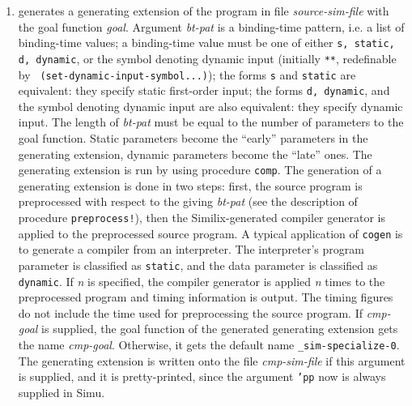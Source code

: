 \begin{sloppypar}
\begin{enumerate}
\item generates a generating extension of the program in file
   {\it source-sim-file} with the goal function {\it goal}.  Argument
   {\it bt-pat} is a binding-time pattern, i.e.  a list of
   binding-time values; a binding-time value must be one of either
   {\tt s, static, d, dynamic}, or the symbol denoting dynamic input
   (initially {\tt ***}, redefinable by {\tt
   (set-dynamic-input-symbol...)}); the forms {\tt s} and {\tt static}
   are equivalent: they specify static first-order input; the forms
   {\tt d, dynamic}, and the symbol denoting dynamic input are also
   equivalent: they specify dynamic input. The length of {\it bt-pat}
   must be equal to the number of parameters to the goal
   function. Static parameters become the ``early'' parameters in the
   generating extension, dynamic parameters become the ``late'' ones.
   The generating extension is run by using procedure {\tt comp}. The
   generation of a generating extension is done in two steps: first,
   the source program is preprocessed with respect to the giving {\it
   bt-pat} (see the description of procedure {\tt preprocess!}), then
   the Similix-generated compiler generator is applied to the
   preprocessed source program.  A typical application of {\tt cogen}
   is to generate a compiler from an interpreter. The interpreter's
   program parameter is classified as {\tt static}, and the data
   parameter is classified as {\tt dynamic}. If {\it n} is specified,
   the compiler generator is applied {\it n} times to the preprocessed
   program and timing information is output. The timing figures do not
   include the time used for preprocessing the source program. If {\it
   cmp-goal} is supplied, the goal function of the generated
   generating extension gets the name {\it cmp-goal}. Otherwise, it
   gets the default name {\tt \_sim-specialize-0}. The generating
   extension is written onto the file {\it cmp-sim-file} if this
   argument is supplied, and it is pretty-printed, since the argument
   {\tt 'pp} now is always supplied in Simu.


\end{enumerate}
\end{sloppypar}
